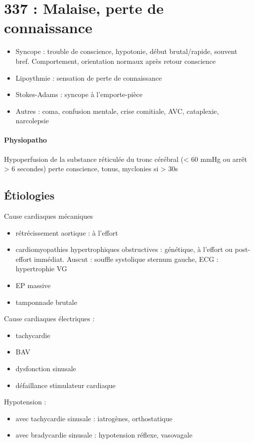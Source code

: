 \documentclass{article}
\begin{document}
\section{337 : Malaise, perte de connaissance}%
\label{sec:337_malaise_perte_de_connaissance}
\begin{itemize}
  \item Syncope : trouble de conscience, hypotonie, début brutal/rapide, souvent
    bref. Comportement, orientation normaux après retour conscience
  \item Lipoythmie : sensation de perte de connaissance
  \item Stokes-Adams : syncope à l'emporte-pièce
  \item Autres : coma, confusion mentale, crise comitiale, AVC, cataplexie,
    narcolepsie
\end{itemize}

\paragraph{Physiopatho}
Hypoperfusion de la substance réticulée du tronc cérébral (< 60 mmHg ou arrêt >
6 secondes) \thus perte conscience, tonus, myclonies si > 30s

\subsection{Étiologies}
Cause cardiaques mécaniques
\begin{itemize}
  \item rétrécissement aortique : à l'effort
  \item cardiomyopathies hypertrophiques obstructives : génétique, à l'effort ou
    post-effort immédiat. Auscut : souffle systolique sternum gauche, ECG :
    hypertrophie VG
  \item EP massive
  \item tamponnade brutale
\end{itemize}

Cause cardiaques électriques :
\begin{itemize}
  \item tachycardie
  \item BAV
  \item dysfonction sinusale
  \item défaillance stimulateur cardiaque
\end{itemize}

Hypotension :
\begin{itemize}
  \item avec tachycardie sinusale : iatrogènes, orthostatique
  \item avec bradycardie sinusale : hypotension réflexe, vasovagale
\end{itemize}
\end{document}
